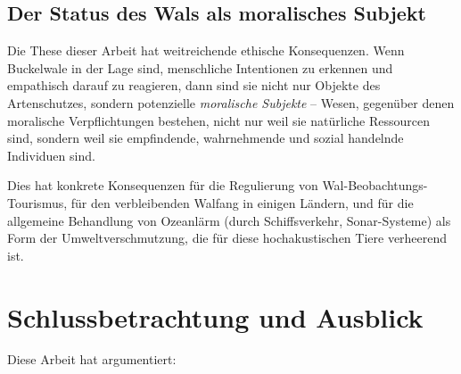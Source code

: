 ﻿\documentclass[12pt,a4paper]{article}
\theoremstyle{definition}
\theoremstyle{remark}
\begin{document}
\subsection{Der Status des Wals als moralisches Subjekt}

Die These dieser Arbeit hat weitreichende ethische Konsequenzen. Wenn
Buckelwale in der Lage sind, menschliche Intentionen zu erkennen und
empathisch darauf zu reagieren, dann sind sie nicht nur Objekte des
Artenschutzes, sondern potenzielle \emph{moralische Subjekte} -- Wesen,
gegenüber denen moralische Verpflichtungen bestehen, nicht nur weil sie
natürliche Ressourcen sind, sondern weil sie empfindende, wahrnehmende
und sozial handelnde Individuen sind.

Dies hat konkrete Konsequenzen für die Regulierung von Wal-Beobachtungs-Tourismus,
für den verbleibenden Walfang in einigen Ländern, und für die allgemeine
Behandlung von Ozeanlärm (durch Schiffsverkehr, Sonar-Systeme) als Form
der Umweltverschmutzung, die für diese hochakustischen Tiere verheerend ist.

\section{Schlussbetrachtung und Ausblick}
\label{sec:schluss}

Diese Arbeit hat argumentiert:
\end{document}
